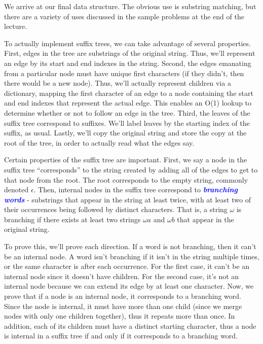 \documentclass[11pt, oneside]{article}
\newcommand{\emphasis}[1]{\textcolor{blue}{\textbf{\textit{#1}}}}
\begin{document}
We arrive at our final data structure. The obvious use is substring matching,
but there are a variety of uses discussed in the sample problems at the end of the lecture.

To actually implement suffix trees, we can take advantage of several properties.
First, edges in the tree are substrings of the original string.
Thus, we'll represent an edge by its start and end indexes in the string.
Second, the edges emanating from a particular node must have unique first characters
(if they didn't, then there would be a new node).
Thus, we'll actually represent children via a dictionary, mapping the first character
of an edge to a node containing the start and end indexes that represent the actual edge.
This enables an O(1) lookup to determine whether or not to follow an edge in the tree.
Third, the leaves of the suffix tree correspond to suffixes.
We'll label leaves by the starting index of the suffix, as usual.
Lastly, we'll copy the original string and store the copy at the root of the tree,
in order to actually read what the edges say.

Certain properties of the suffix tree are important.
First, we say a node in the suffix tree ``corresponds'' to the string created by adding all of the edges to get to that node from the root.
The root corresponds to the empty string, commonly denoted \( \epsilon \).
Then, internal nodes in the suffix tree correspond to \emphasis{branching words} - substrings that appear in the string at least twice, with at least two of their occurrences being followed by distinct characters.
That is, a string \( \omega \) is branching if there exists at least two strings \( \omega a \) and \( \omega b \) that appear in the original string.

To prove this, we'll prove each direction. If a word is not branching, then it can't be an internal node.
A word isn't branching if it isn't in the string multiple times, or the same character is after each occurrence.
For the first case, it can't be an internal node since it doesn't have children.
For the second case, it's not an internal node because we can extend its edge by at least one character.
Now, we prove that if a node is an internal node, it corresponds to a branching word.
Since the node is internal, it must have more than one child (since we merge nodes with only one children together),
thus it repeats more than once. In addition, each of its children must have a distinct starting character,
thus a node is internal in a suffix tree if and only if it corresponds to a branching word.
\end{document}
